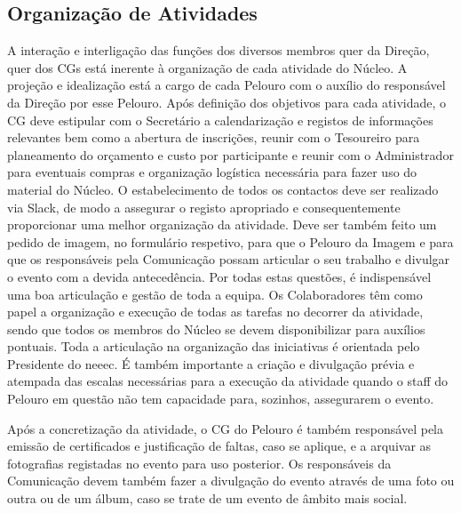 
\subsection{Organização de Atividades}

A interação e interligação das funções dos diversos membros quer da Direção, quer dos CGs está inerente à organização de cada atividade do Núcleo. A projeção e idealização está a cargo de cada Pelouro com o auxílio do responsável da Direção por esse Pelouro. Após definição dos objetivos para cada atividade, o CG deve estipular com o Secretário a calendarização e registos de informações relevantes bem como a abertura de inscrições, reunir com o Tesoureiro para planeamento do orçamento e custo por participante e reunir com o Administrador para eventuais compras e organização logística necessária para fazer uso do material do Núcleo. O estabelecimento de todos os contactos deve ser realizado via Slack, de modo a assegurar o registo apropriado e consequentemente proporcionar uma melhor organização da atividade. Deve ser também feito um pedido de imagem, no formulário respetivo, para que o Pelouro da Imagem e para que os responsáveis pela Comunicação possam articular o seu trabalho e divulgar o evento com a devida antecedência. Por todas estas questões, é indispensável uma boa articulação e gestão de toda a equipa. Os Colaboradores têm como papel a organização e execução de todas as tarefas no decorrer da atividade, sendo que todos os membros do Núcleo se devem disponibilizar para auxílios pontuais. Toda a articulação na organização das iniciativas é orientada pelo Presidente do \acrshort{neeec}. É também importante a criação e divulgação prévia e atempada das escalas necessárias para a execução da atividade quando o staff do Pelouro em questão não tem capacidade para, sozinhos, assegurarem o evento.

Após a concretização da atividade, o CG do Pelouro é também responsável pela emissão de certificados e justificação de faltas, caso se aplique, e a arquivar as fotografias registadas no evento para uso posterior. Os responsáveis da Comunicação devem também fazer a divulgação do evento através de uma foto ou outra ou de um álbum, caso se trate de um evento de âmbito mais social.